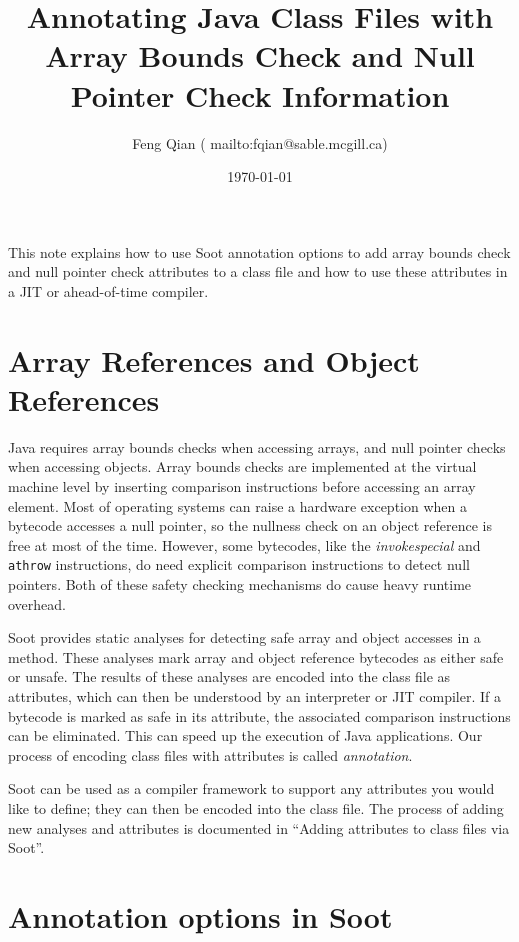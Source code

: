 \documentclass{article}
\begin{document}
\title{Annotating Java Class Files with \\
       Array Bounds Check and Null Pointer Check Information}
\author{Feng Qian (
        {mailto:fqian@sable.mcgill.ca})}
\date{\today}
\maketitle

This note explains how to use Soot annotation options to add array
bounds check and null pointer check attributes to a class file and
how to use these attributes in a JIT or ahead-of-time compiler.

\section{Array References and Object References}
Java requires array bounds checks when accessing arrays, and null
pointer checks when accessing objects.  Array bounds checks are
implemented at the virtual machine level by inserting comparison
instructions before accessing an array element.  Most of operating systems
can raise a hardware exception when a bytecode accesses a null
pointer, so the nullness check on an object reference is 
free at most of the time.  However, some bytecodes, like the {\it
invokespecial} and {\tt athrow} instructions, do need explicit comparison
instructions to detect null pointers.  Both of these safety checking
mechanisms do cause heavy runtime overhead.

Soot provides static analyses for detecting safe array and object
accesses in a method.  These analyses mark array and object reference bytecodes as
either safe or unsafe.  The results of these analyses are encoded into the
class file as attributes, which can then be understood by an
interpreter or JIT compiler. If a bytecode is marked as safe in its
attribute, the associated comparison instructions can be eliminated.
This can speed up the execution of Java applications. Our process of
encoding class files with attributes is called {\em annotation}.

Soot can be used as a compiler framework to support any attributes you
would like to define; they can then be encoded into the class file.
The process of adding new analyses and attributes is documented in
``Adding attributes to class files via Soot''.

\section{Annotation options in Soot}
\end{document}
